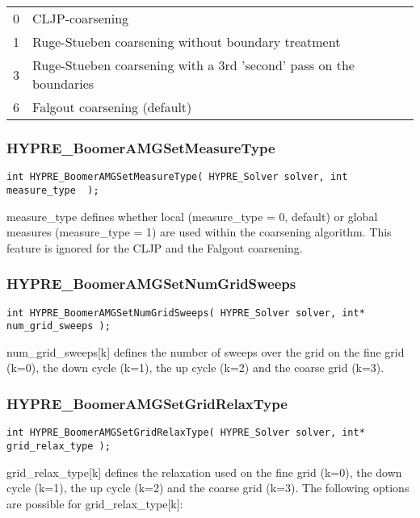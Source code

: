 \begin{tabular}{l l}
  0 & CLJP-coarsening \\
  1& 	Ruge-Stueben coarsening without boundary treatment \\
  3& 	Ruge-Stueben coarsening with a 3rd 'second' pass on the boundaries \\
 6 & 	Falgout coarsening (default) \\
\end{tabular}

\subsubsection*{HYPRE\_BoomerAMGSetMeasureType}
\begin{display}
\begin{verbatim}
int HYPRE_BoomerAMGSetMeasureType( HYPRE_Solver solver, int measure_type  );
\end{verbatim}
\end{display}
measure\_type defines 
whether local (measure\_type = 0, default) or global measures 
(measure\_type = 1) are used within the coarsening 
algorithm. This feature is ignored for the CLJP and the Falgout coarsening.

\subsubsection*{HYPRE\_BoomerAMGSetNumGridSweeps}
\begin{display}
\begin{verbatim}
int HYPRE_BoomerAMGSetNumGridSweeps( HYPRE_Solver solver, int* num_grid_sweeps );
\end{verbatim}
\end{display}
num\_grid\_sweeps[k] defines the number of sweeps over the grid on the fine 
grid (k=0), the down cycle (k=1), the up cycle (k=2) and the coarse grid (k=3).

\subsubsection*{HYPRE\_BoomerAMGSetGridRelaxType}
\begin{display}
\begin{verbatim}
int HYPRE_BoomerAMGSetGridRelaxType( HYPRE_Solver solver, int* grid_relax_type );
\end{verbatim}
\end{display}
grid\_relax\_type[k] defines the relaxation used on the fine 
grid (k=0), the down cycle (k=1), the up cycle (k=2) and the coarse grid (k=3).
The following options are possible for grid\_relax\_type[k]:

